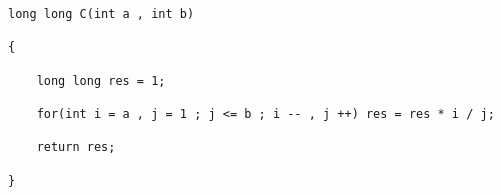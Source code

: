 \documentclass[E:/GsjzTle/main/main.tex]{subfiles}
\begin{document}
\begin{lstlisting}
long long C(int a , int b)

{

	long long res = 1;

	for(int i = a , j = 1 ; j <= b ; i -- , j ++) res = res * i / j;

	return res;

}
\end{lstlisting}
\end{document}
